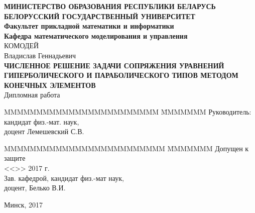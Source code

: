 \begin{titlepage}
    \begin{center}
        \normalsize {\bf МИНИСТЕРСТВО ОБРАЗОВАНИЯ РЕСПУБЛИКИ БЕЛАРУСЬ} \\
        \vspace{0.5cm}
        \normalsize {\bf БЕЛОРУССКИЙ ГОСУДАРСТВЕННЫЙ УНИВЕРСИТЕТ} \\
        \vspace{0.5cm}
        \normalsize {\bf Факультет прикладной математики и информатики} \\
        \vspace{0.5cm}
        \normalsize {\bf Кафедра математического моделирования и управления} \\
        \vspace{2cm}
        КОМОДЕЙ \\
        Владислав Геннадьевич \\
        \vspace{1cm}
        \normalsize {\bf ЧИСЛЕННОЕ РЕШЕНИЕ ЗАДАЧИ СОПРЯЖЕНИЯ УРАВНЕНИЙ 
        ГИПЕРБОЛИЧЕСКОГО И ПАРАБОЛИЧЕСКОГО ТИПОВ МЕТОДОМ КОНЕЧНЫХ ЭЛЕМЕНТОВ}\\
        \vspace{1cm}
        \normalsize Дипломная работа \\
        \vspace{2cm}
        \begin{tabbing}
            MMMMMMMMMMMMMMMMMMMMMMMM \= MMMMMMM \kill
            \> Руководитель: \\
            \> кандидат физ.-мат. наук, \\
            \> доцент Лемешевский С.В. 
        \end{tabbing}
        \begin{tabbing}
            MMMMMMMMMMMMMMMMMMMMMMMMM \= MMMMMMM \kill
            Допущен к защите \>  \\
            <<\underline{\hspace{1cm}}>> \underline{\hspace{3.3cm}} 2017 г. \\
            Зав. кафедрой, кандидат физ.-мат наук,\\
            доцент, Белько В.И.
        \end{tabbing}

        \vspace{2cm}

        \large Минск, 2017
    \end{center}
\end{titlepage}
\clearpage
\setcounter{page}{2}
